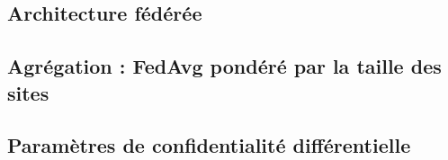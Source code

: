 
\subsection{Architecture fédérée}
\label{sec:architecture}

\subsection{Agrégation : FedAvg pondéré par la taille des sites}
\label{sec:fedavg}

\subsection{Paramètres de confidentialité différentielle}
\label{sec:parametres-dp}
